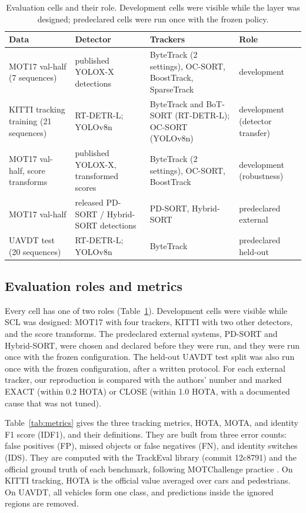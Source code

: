 \documentclass[pdflatex,referee,sn-mathphys-num]{sn-jnl}
\newcommand{\scl}{SCL}
\begin{document}
\begin{table}[t]
\caption{Evaluation cells and their role. Development cells were visible while
the layer was designed; predeclared cells were run once with the frozen
policy.}
\label{tab:data}
\centering\footnotesize
\setlength{\tabcolsep}{4pt}
\begin{tabular}{@{}>{\raggedright\arraybackslash}p{29mm}>{\raggedright\arraybackslash}p{25mm}>{\raggedright\arraybackslash}p{42mm}>{\raggedright\arraybackslash}p{25mm}@{}}
\toprule
Data & Detector & Trackers & Role\\
\midrule
MOT17 val-half (7 sequences) & published YOLOX-X detections & ByteTrack (2 settings), OC-SORT, BoostTrack, SparseTrack & development\\
KITTI tracking training (21 sequences) & RT-DETR-L; YOLOv8n & ByteTrack and BoT-SORT (RT-DETR-L); OC-SORT (YOLOv8n) & development (detector transfer)\\
MOT17 val-half, score transforms & published YOLOX-X, transformed scores & ByteTrack (2 settings), OC-SORT, BoostTrack & development (robustness)\\
MOT17 val-half & released PD-SORT / Hybrid-SORT detections & PD-SORT, Hybrid-SORT & predeclared external\\
UAVDT test (20 sequences) & RT-DETR-L; YOLOv8n & ByteTrack & predeclared held-out\\
\bottomrule
\end{tabular}
\end{table}

\subsection{Evaluation roles and metrics}\label{sec:roles}
Every cell has one of two roles (Table~\ref{tab:data}). Development cells
were visible while \scl{} was designed: MOT17 with four trackers, KITTI with
two other detectors, and the score transforms. The predeclared external systems,
PD-SORT and Hybrid-SORT, were chosen and declared before they were run, and
they were run once with the frozen configuration. The held-out UAVDT test
split was also run once with the frozen configuration, after a written
protocol.
For each external tracker,
our reproduction is compared with the authors' number and marked EXACT
(within 0.2 HOTA) or CLOSE (within 1.0 HOTA, with a documented cause that was
not tuned).

\label{sec:metrics}Table~\ref{tab:metrics} gives the three tracking metrics,
HOTA, MOTA, and identity F1 score (IDF1),
and their definitions. They are built from three error counts: false
positives (FP), missed objects or false negatives (FN), and identity switches
(IDS). They are computed with the TrackEval library (commit
12c8791) and the official ground truth of each benchmark, following
MOTChallenge practice \cite{dendorfer2021motchallenge}. On KITTI tracking,
HOTA is the official value averaged over cars and pedestrians. On UAVDT, all vehicles form one class, and
predictions inside the ignored regions are removed.
\end{document}
